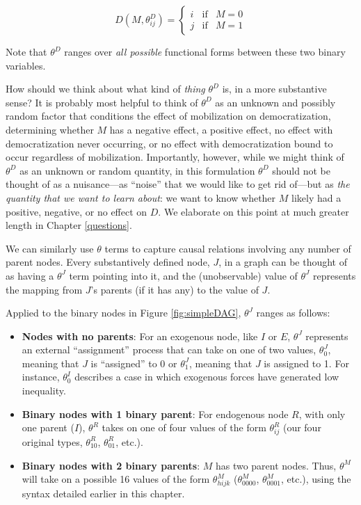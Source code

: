 \documentclass[
  12pt,
]{book}
\providecommand{\tightlist}{%
  \setlength{\itemsep}{0pt}\setlength{\parskip}{0pt}}
\begin{document}
\[D(M, \theta^D_{ij}) = \left\{\begin{array}{ccc} i & \text{if} & M=0 \\ j & \text{if} & M=1 \end{array}\right.\]

Note that \(\theta^D\) ranges over \emph{all possible} functional forms between these two binary variables.

How should we think about what kind of \emph{thing} \(\theta^D\) is, in a more substantive sense? It is probably most helpful to think of \(\theta^D\) as an unknown and possibly random factor that conditions the effect of mobilization on democratization, determining whether \(M\) has a negative effect, a positive effect, no effect with democratization never occurring, or no effect with democratization bound to occur regardless of mobilization. Importantly, however, while we might think of \(\theta^D\) as an unknown or random quantity, in this formulation \(\theta^D\) should not be thought of as a nuisance---as ``noise'' that we would like to get rid of---but as \emph{the quantity that we want to learn about}: we want to know whether \(M\) likely had a positive, negative, or no effect on \(D\). We elaborate on this point at much greater length in Chapter \ref{questions}.

We can similarly use \(\theta\) terms to capture causal relations involving any number of parent nodes. Every substantively defined node, \(J\), in a graph can be thought of as having a \(\theta^J\) term pointing into it, and the (unobservable) value of \(\theta^J\) represents the mapping from \(J\)'s parents (if it has any) to the value of \(J\).

Applied to the binary nodes in Figure \ref{fig:simpleDAG}, \(\theta^J\) ranges as follows:

\begin{itemize}
\tightlist
\item
  \textbf{Nodes with no parents}: For an exogenous node, like \(I\) or \(E\), \(\theta^J\) represents an external ``assignment'' process that can take on one of two values, \(\theta^J_{0}\), meaning that \(J\) is ``assigned'' to \(0\) or \(\theta^J_{1}\), meaning that \(J\) is assigned to 1. For instance, \(\theta^I_{0}\) describes a case in which exogenous forces have generated low inequality.
\item
  \textbf{Binary nodes with 1 binary parent}: For endogenous node \(R\), with only one parent (\(I\)), \(\theta^R\) takes on one of four values of the form \(\theta^R_{ij}\) (our four original types, \(\theta^R_{10}\), \(\theta^R_{01}\), etc.).
\item
  \textbf{Binary nodes with 2 binary parents}: \(M\) has two parent nodes. Thus, \(\theta^M\) will take on a possible 16 values of the form \(\theta^M_{hijk}\) (\(\theta^M_{0000}\), \(\theta^M_{0001}\), etc.), using the syntax detailed earlier in this chapter.
\end{itemize}
\end{document}
